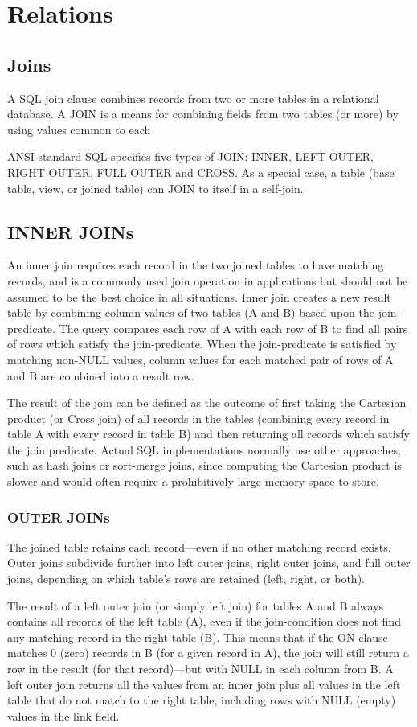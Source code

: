 \documentclass[10pt,twoside,english]{_support/latex/sbabook/sbabook}
\begin{document}
\section{Relations}\subsection{Joins}
A SQL join clause combines records from two or more
tables in a relational database. A JOIN is a means for combining fields from two
tables (or more) by using values common to each

ANSI-standard SQL specifies five types of JOIN: INNER, LEFT OUTER, RIGHT OUTER,
FULL OUTER and CROSS. As a special case, a table (base table, view, or joined
table) can JOIN to itself in a self-join.
\subsection{INNER JOINs}
An inner join requires each record in the two joined tables to
have matching records, and is a commonly used join operation in applications but
should not be assumed to be the best choice in all situations. Inner join
creates a new result table by combining column values of two tables (A and B)
based upon the join-predicate. The query compares each row of A with each row of
B to find all pairs of rows which satisfy the join-predicate. When the
join-predicate is satisfied by matching non-NULL values, column values for each
matched pair of rows of A and B are combined into a result row.

The result of the join can be defined as the outcome of first taking the
Cartesian product (or Cross join) of all records in the tables (combining every
record in table A with every record in table B) and then returning all records
which satisfy the join predicate. Actual SQL implementations normally use other
approaches, such as hash joins or sort-merge joins, since computing the
Cartesian product is slower and would often require a prohibitively large memory
space to store. 
\subsubsection{OUTER JOINs }
The joined table retains each record—even if no other matching record exists. Outer joins subdivide further into left outer
joins, right outer joins, and full outer joins, depending on which table's rows
are retained (left, right, or both).

The result of a left outer join (or simply left join) for tables A and B always
contains all records of the left table (A), even if the join-condition does
not find any matching record in the right table (B). This means that if the ON
clause matches 0 (zero) records in B (for a given record in A), the join will
still return a row in the result (for that record)—but with NULL in each column
from B. A left outer join returns all the values from an inner join plus all
values in the left table that do not match to the right table, including rows
with NULL (empty) values in the link field.
\end{document}
